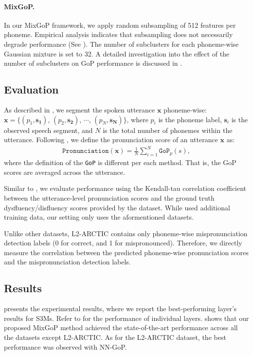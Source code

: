 \paragraph{MixGoP.} In our MixGoP framework, we apply random subsampling of 512 features per phoneme.
Empirical analysis indicates that subsampling does not necessarily degrade performance (See ).
The number of subclusters for each phoneme-wise Gaussian mixture is set to 32. 
A detailed investigation into the effect of the number of subclusters on GoP performance is discussed in .


\subsection{Evaluation}\label{subsec:eval}
As described in , we segment the spoken utterance $\mathbf{x}$ phoneme-wise: $\mathbf{x} = \{(p_1, \mathbf{s_1})$, $(p_2, \mathbf{s_2})$, $\cdots$, $(p_N, \mathbf{s_N})\}$, where $p_i$ is the phoneme label, $\mathbf{s}_i$ is the observed speech segment, and $N$ is the total number of phonemes within the utterance.
Following \citet{yeo23_interspeech}, we define the pronunciation score of an utterance $\mathbf{x}$ as:
\begin{align}
    \texttt{Pronunciation}(\mathbf{x}) = \frac{1}{N} \sum_{i=1}^{N} \texttt{GoP}_p(s),\label{eq:1_n}
\end{align}
where the definition of the \texttt{GoP} is different per each method.
That is, the GoP scores are averaged across the utterance.



Similar to \citet{yeo23_interspeech}, we evaluate performance using the Kendall-tau correlation coefficient between the utterance-level pronunciation scores and the ground truth dysfluency/disfluency scores provided by the dataset. 
While \citet{yeo23_interspeech} used additional training data, our setting only uses the aformentioned datasets.


Unlike other datasets, L2-ARCTIC contains only phoneme-wise mispronunciation detection labels (0 for correct, and 1 for mispronounced).
Therefore, we directly measure the correlation between the predicted phoneme-wise pronunciation scores and the mispronunciation detection labels.



\subsection{Results}\label{subsec:results}
 presents the experimental results, where we report the best-performing layer's results for S3Ms.
Refer to  for the performance of individual layers.
 shows that our proposed MixGoP method achieved the state-of-the-art performance across all the datasets except L2-ARCTIC.
As for the L2-ARCTIC dataset, the best performance was observed with NN-GoP. 


